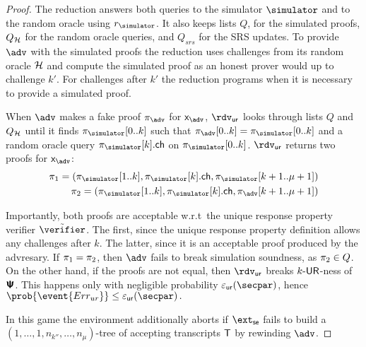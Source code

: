 \begin{proof}
	The reduction answers both queries to the simulator $\simulator$ and to the random oracle using $\rsim$. It also keeps lists $Q$, for the simulated proofs, $Q_{\mathcal{H}}$ for the random oracle queries, and $Q_{srs}$ for the SRS updates. To provide $\adv$ with the simulated proofs the reduction uses challenges from its random oracle $\mathcal{H}$ and compute the simulated proof as an honest prover would up to challenge $k'$. For challenges after $k'$ the reduction programs when it is necessary to provide a simulated proof.

	When $\adv$ makes a fake proof $\zkproof_{\adv}$ for $\inp_{\adv}$, $\rdvur$
		looks through lists $Q$ and $Q_{\mathcal{H}}$ until it finds $\zkproof_{\simulator}[0..k]$
		such that $\zkproof_{\adv}[0..k] = \zkproof_{\simulator}[0..k]$ and a random
		oracle query $\zkproof_{\simulator}[k].\ch$ on $\zkproof_{\simulator}[0..k]$.
	$\rdvur$ returns two proofs for $\inp_{\adv}$:
		\begin{align*}
		\zkproof_1 = (\zkproof_{\simulator}[1..k],
		\zkproof_{\simulator}[k].\ch, \zkproof_{\simulator}[k + 1..\mu + 1])\\
		\zkproof_2 = (\zkproof_{\simulator}[1..k],
		\zkproof_{\simulator}[k].\ch, \zkproof_{\adv}[k + 1..\mu + 1])
		\end{align*}

	Importantly, both proofs are acceptable w.r.t~the unique response property verifier $\tilde{\verifier}$. The first, since the unique response property definition allows any challenges after $k$. The latter, since it is an acceptable proof produced by the advresary.
	If $\pi_1 = \pi_2$, then $\adv$ fails to break simulation soundness, as
	$\pi_2 \in Q$. On the other hand, if the proofs are not equal, then $\rdvur$
	breaks ${k\text{-}\mathsf{UR}}$-ness of $\bm{\mathsf{\Psi}}$. This happens only with negligible probability
	$\epsur(\secpar)$, hence \( \prob{\event{\errur}} \leq \epsur(\secpar)\,. \)

	\iffalse
	 In this game the environment additionally aborts if $\extse$ fails to build a
	$(1, \ldots, 1, n_{k''}, \ldots, n_\mu)$-tree of accepting transcripts $\mathsf{T}$ by rewinding
	$\adv$.
	

\end{proof}
